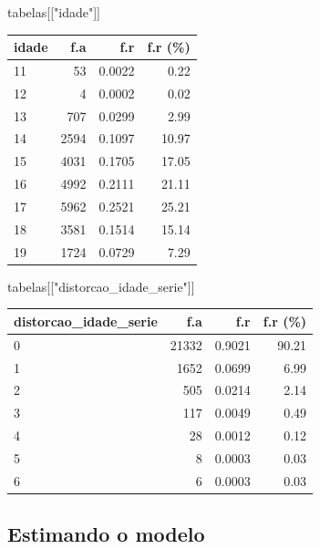 \documentclass[
]{article}
\newenvironment{Shaded}{\begin{snugshade}}{\end{snugshade}}
\newcommand{\NormalTok}[1]{\textcolor[rgb]{0.00,0.23,0.31}{#1}}
\newcommand{\StringTok}[1]{\textcolor[rgb]{0.13,0.47,0.30}{#1}}
\begin{document}
\begin{Shaded}
\begin{Highlighting}[]
\NormalTok{tabelas[[}\StringTok{"idade"}\NormalTok{]]}
\end{Highlighting}
\end{Shaded}

\begin{longtable}[]{@{}lrrr@{}}
\toprule()
idade & f.a & f.r & f.r (\%) \\
\midrule()
\endhead
11 & 53 & 0.0022 & 0.22 \\
12 & 4 & 0.0002 & 0.02 \\
13 & 707 & 0.0299 & 2.99 \\
14 & 2594 & 0.1097 & 10.97 \\
15 & 4031 & 0.1705 & 17.05 \\
16 & 4992 & 0.2111 & 21.11 \\
17 & 5962 & 0.2521 & 25.21 \\
18 & 3581 & 0.1514 & 15.14 \\
19 & 1724 & 0.0729 & 7.29 \\
\bottomrule()
\end{longtable}

\begin{Shaded}
\begin{Highlighting}[]
\NormalTok{tabelas[[}\StringTok{"distorcao\_idade\_serie"}\NormalTok{]]}
\end{Highlighting}
\end{Shaded}

\begin{longtable}[]{@{}lrrr@{}}
\toprule()
distorcao\_idade\_serie & f.a & f.r & f.r (\%) \\
\midrule()
\endhead
0 & 21332 & 0.9021 & 90.21 \\
1 & 1652 & 0.0699 & 6.99 \\
2 & 505 & 0.0214 & 2.14 \\
3 & 117 & 0.0049 & 0.49 \\
4 & 28 & 0.0012 & 0.12 \\
5 & 8 & 0.0003 & 0.03 \\
6 & 6 & 0.0003 & 0.03 \\
\bottomrule()
\end{longtable}

\hypertarget{estimando-o-modelo}{%
\subsection{Estimando o modelo}\label{estimando-o-modelo}}
\end{document}
